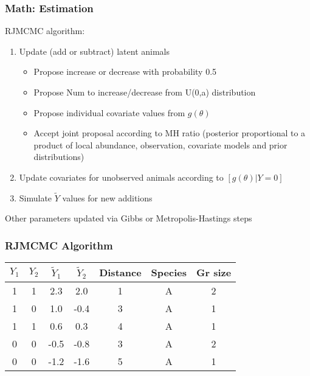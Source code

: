 \documentclass[serif,mathserif]{beamer}
\begin{document}
\begin{frame}
    \frametitle{Math: Estimation}
    RJMCMC algorithm:
    \begin{enumerate}
        \item Update (add or subtract)  latent animals \pause
            \begin{itemize}
              \item Propose increase or decrease with probability 0.5 \pause
              \item Propose Num to increase/decrease from U(0,a) distribution \pause
              \item Propose individual covariate values from $g(\theta)$ \pause
              \item Accept joint proposal according to MH ratio (posterior proportional to a product of local abundance, observation, covariate models and
                  prior distributions) \pause
            \end{itemize}
        \item Update covariates for unobserved animals according to $[g(\theta)|Y=0]$ \pause
        \item Simulate $\tilde{Y}$ values for new additions \pause
    \end{enumerate}
    Other parameters updated via Gibbs or Metropolis-Hastings steps
\end{frame}

\begin{frame}
  \frametitle{RJMCMC Algorithm}
         \begin{tabular}{ccccccc}
        \hline \hline
        $Y_1$ & $Y_2$ & $\tilde{Y}_1$ & $\tilde{Y}_2$ & Distance & Species & Gr size\\
        \hline
        1 & 1 & 2.3 & 2.0 & 1 & A & 2\\
        1 & 0 & 1.0 & -0.4 & 3 & A & 1 \\
        1 & 1 & 0.6 & 0.3 & 4 & A & 1 \\
        0 & 0 & -0.5 & -0.8 & 3 & A & 2 \\
        0 & 0 & -1.2 & -1.6 & 5 & A & 1 \\
         \hline
        \end{tabular}
\end{frame}
\end{document}
